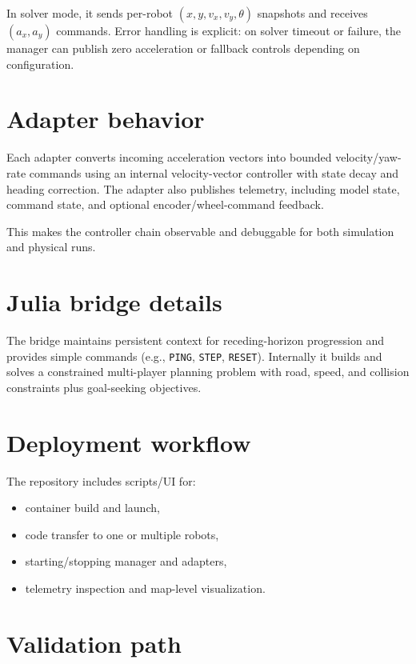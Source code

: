 In solver mode, it sends per-robot $(x,y,v_x,v_y,\theta)$ snapshots and
receives $(a_x,a_y)$ commands. Error handling is explicit: on solver timeout or
failure, the manager can publish zero acceleration or fallback controls depending
on configuration.

\section{Adapter behavior}

Each adapter converts incoming acceleration vectors into bounded
velocity/yaw-rate commands using an internal velocity-vector controller with
state decay and heading correction. The adapter also publishes telemetry,
including model state, command state, and optional encoder/wheel-command
feedback.

This makes the controller chain observable and debuggable for both simulation
and physical runs.

\section{Julia bridge details}

The bridge maintains persistent context for receding-horizon progression and
provides simple commands (e.g., \texttt{PING}, \texttt{STEP}, \texttt{RESET}).
Internally it builds and solves a constrained multi-player planning problem with
road, speed, and collision constraints plus goal-seeking objectives.

\section{Deployment workflow}

The repository includes scripts/UI for:

\begin{itemize}
    \item container build and launch,
    \item code transfer to one or multiple robots,
    \item starting/stopping manager and adapters,
    \item telemetry inspection and map-level visualization.
\end{itemize}

\section{Validation path}

